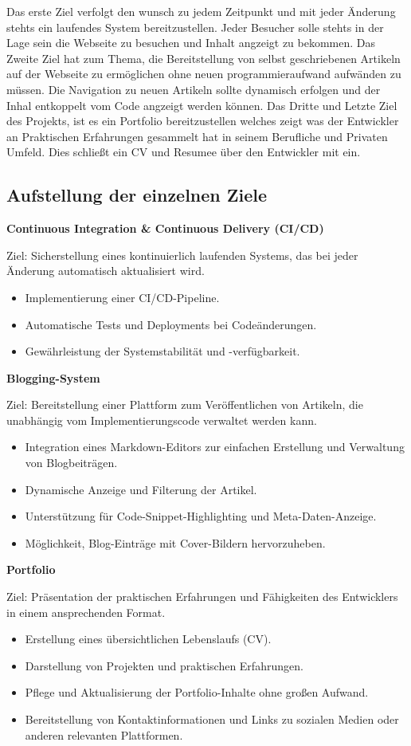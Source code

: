 Das erste Ziel verfolgt den wunsch zu jedem Zeitpunkt und mit jeder Änderung stehts ein laufendes
System bereitzustellen. Jeder Besucher solle stehts in der Lage sein die Webseite zu besuchen und
Inhalt angzeigt zu bekommen.
Das Zweite Ziel hat zum Thema, die Bereitstellung von selbst geschriebenen Artikeln auf der Webseite
zu ermöglichen ohne neuen programmieraufwand aufwänden zu müssen. Die Navigation zu neuen Artikeln
sollte dynamisch erfolgen und der Inhal entkoppelt vom Code angzeigt werden können.
Das Dritte und Letzte Ziel des Projekts, ist es ein Portfolio bereitzustellen welches zeigt was der
Entwickler an Praktischen Erfahrungen gesammelt hat in seinem Berufliche und Privaten Umfeld. Dies
schließt ein CV und Resumee über den Entwickler mit ein.


\subsection{ Aufstellung der einzelnen Ziele }

\textbf{Continuous Integration \& Continuous Delivery (CI/CD)}

Ziel: Sicherstellung eines kontinuierlich laufenden Systems, das bei jeder Änderung automatisch aktualisiert wird.
\begin{itemize}
    \item Implementierung einer CI/CD-Pipeline.
    \item Automatische Tests und Deployments bei Codeänderungen.
    \item Gewährleistung der Systemstabilität und -verfügbarkeit.
\end{itemize}

\textbf{Blogging-System}

Ziel: Bereitstellung einer Plattform zum Veröffentlichen von Artikeln, die unabhängig vom Implementierungscode verwaltet werden kann.
\begin{itemize}
    \item Integration eines Markdown-Editors zur einfachen Erstellung und Verwaltung von Blogbeiträgen.
    \item Dynamische Anzeige und Filterung der Artikel.
    \item Unterstützung für Code-Snippet-Highlighting und Meta-Daten-Anzeige.
    \item Möglichkeit, Blog-Einträge mit Cover-Bildern hervorzuheben.
\end{itemize}

\textbf{Portfolio}

Ziel: Präsentation der praktischen Erfahrungen und Fähigkeiten des Entwicklers in einem ansprechenden Format.
\begin{itemize}
    \item Erstellung eines übersichtlichen Lebenslaufs (CV).
    \item Darstellung von Projekten und praktischen Erfahrungen.
    \item Pflege und Aktualisierung der Portfolio-Inhalte ohne großen Aufwand.
    \item Bereitstellung von Kontaktinformationen und Links zu sozialen Medien oder anderen relevanten Plattformen.
\end{itemize}